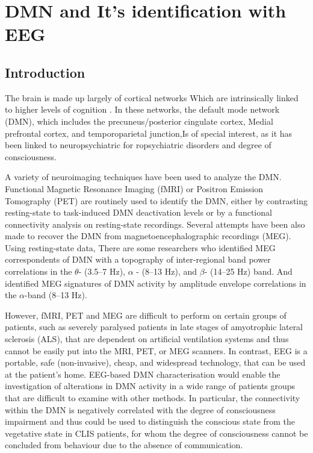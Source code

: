 
\chapter{DMN and It's identification with EEG} %

\label{Chapter 1} %


\section{Introduction}



The brain is made up largely of cortical networks Which are intrinsically linked to higher levels of cognition . In these networks, the default mode network (DMN), which includes the precuneus/posterior cingulate cortex, Medial prefrontal cortex, and temporoparietal junction,Is of special interest, as it has been linked to neuropsychiatric for ropsychiatric disorders  and degree of consciousness.
 
A variety of neuroimaging techniques have been used to analyze the DMN. Functional Magnetic Resonance Imaging (fMRI) or Positron Emission Tomography (PET) are routinely used to identify the DMN, either by contrasting resting-state to task-induced DMN deactivation levels or by a functional connectivity analysis on resting-state recordings. Several attempts have been also made to recover the DMN from magnetoencephalographic recordings (MEG). Using resting-state data, There are some researchers who identified MEG correspondents of DMN with a topography of inter-regional band power correlations in the $\theta$- (3.5–7 Hz), $\alpha$ - (8–13 Hz), and $\beta$- (14–25 Hz) band. And identified MEG signatures of DMN activity by amplitude envelope correlations in the $\alpha$-band (8–13 Hz).

However, fMRI, PET and MEG are difficult to perform on certain groups of patients, such as severely paralysed patients in late stages of amyotrophic lateral sclerosis (ALS), that are dependent on artificial ventilation systems and thus cannot be easily put into the MRI, PET, or MEG scanners. In contrast, EEG is a portable, safe (non-invasive), cheap, and widespread technology, that can be used at the patient’s home. EEG-based DMN characterisation would enable the investigation of alterations in DMN activity in a wide range
of patients groups that are difficult to examine with other methods. In particular, the connectivity within the DMN is negatively correlated with the degree of consciousness impairment and thus could be used to distinguish the conscious state from the vegetative state in CLIS  patients, for whom the degree of consciousness cannot be concluded from behaviour due to the absence of communication.

